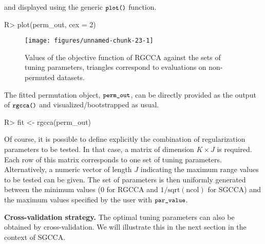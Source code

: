 \documentclass[
]{jss}
\begin{document}
\normalsize

and displayed using the generic \(\small{\texttt{plot()}}\) function.

\footnotesize

\begin{CodeChunk}
\begin{CodeInput}
R> plot(perm_out, cex = 2)
\end{CodeInput}
\begin{figure}[H]

{\centering \texttt{[image: figures/unnamed-chunk-23-1]} 

}

\caption[Values of the objective function of RGCCA against the sets of tuning parameters, triangles correspond to evaluations on non-permuted datasets]{Values of the objective function of RGCCA against the sets of tuning parameters, triangles correspond to evaluations on non-permuted datasets.}\label{fig:unnamed-chunk-23}
\end{figure}
\end{CodeChunk}

\normalsize

The fitted permutation object, \(\small{\texttt{perm\_out}}\), can be
directly provided as the output of \(\small{\texttt{rgcca()}}\) and
visualized/bootstrapped as usual.

\footnotesize

\begin{CodeChunk}
\begin{CodeInput}
R> fit <- rgcca(perm_out)
\end{CodeInput}
\end{CodeChunk}

\normalsize

Of course, it is possible to define explicitly the combination of
regularization parameters to be tested. In that case, a matrix of
dimension \(K \times J\) is required. Each row of this matrix
corresponds to one set of tuning parameters. Alternatively, a numeric
vector of length \(J\) indicating the maximum range values to be tested
can be given. The set of parameters is then uniformly generated between
the minimum values (0 for RGCCA and \(1/\text{sqrt}(\text{ncol})\) for
SGCCA) and the maximum values specified by the user with
\(\small{\texttt{par\_value}}\).

\textbf{Cross-validation strategy.} The optimal tuning parameters can
also be obtained by cross-validation. We will illustrate this in the
next section in the context of SGCCA.
\end{document}

